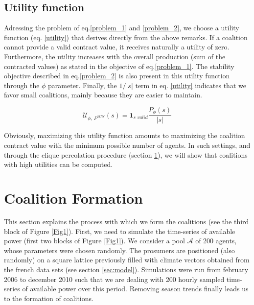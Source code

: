 \documentclass[conference]{IEEEtran}
\begin{document}
\subsection{Utility function}\label{subsec:UtilityFunc}
Adressing the problem of eq.\ref{problem_1} and \ref{problem_2}, we choose a utility function (eq. \ref{utility}) that derives directly from the above remarks. If a coalition cannot provide a valid contract value, it receives naturally a utility of zero. Furthermore, the utility increases with the overall production (sum of the contracted values) as stated in the objective of eq.\ref{problem_1}. The stability objective described in eq.\ref{problem_2} is also present in this utility function through the $ \phi $ parameter. Finally, the $ 1/|s| $ term in eq. \ref{utility} indicates that we favor small coalitions, mainly because they are easier to maintain.

\begin{equation}
 \mathcal{U}_{\phi,\ P^{MIN}}(s) = \mathbf{1}_{\textit{s\ valid}} \dfrac{P_{\phi}(s)}{|s|} 
\label{utility}
\end{equation}

Obviously, maximizing this utility function amounts to maximizing the coalition contract value with the minimum possible number of agents. In such settings, and through the clique percolation procedure (section \ref{sec:forming}), we will show that coalitions with high utilities can be computed.

%
%

\section{Coalition Formation}
\label{sec:forming}

This section explains the process with which we form the coalitions (see the third block of Figure \ref{Fig1}). First, we need to simulate the time-series of available power (first two blocks of Figure \ref{Fig1}). We consider a pool $ \mathcal{A} $ of 200 agents, whose parameters were chosen randomly. The prosumers are positioned (also randomly) on a square lattice previously filled with climate vectors obtained from the french data sets (see section \ref{sec:model}). Simulations were run from february 2006 to december 2010 such that we are dealing with 200 hourly sampled time-series of available power over this period. Removing season trends finally leads us to the formation of coalitions. 
\end{document}
